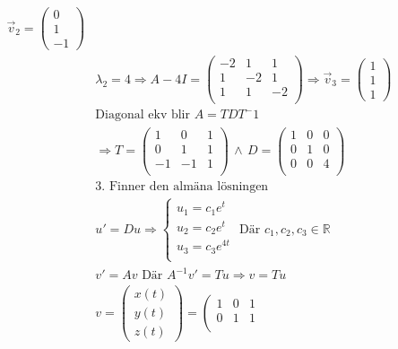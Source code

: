 \begin{multicols}{2}
\begin{align*}
  \vec{v}_2 = \begin{pmatrix} 0 \\ 1 \\ -1  \end{pmatrix} \\
  &\lambda_2 = 4 \Rightarrow{}  A -4I =
  \left(\begin{array}{ccc}
    -2 & 1 & 1 \\
    1 & -2 & 1 \\
    1 & 1 & -2 \\
  \end{array}\right) \Rightarrow{}
  \vec{v}_3 = \begin{pmatrix} 1 \\ 1 \\ 1  \end{pmatrix} \\
  &\text{Diagonal ekv blir } A=TDT^-1 \\
  &\Rightarrow{} T =
  \left(\begin{array}{ccc}
    1 &  0 & 1 \\
    0 &  1 & 1 \\
    -1 & -1 & 1 \\
  \end{array}\right) \, \land{} \, D =
  \left(\begin{array}{ccc}
    1 & 0 & 0 \\
    0 & 1 & 0 \\
    0 & 0 & 4 \\
  \end{array}\right)
  &\\
  &\text{3. Finner den almäna lösningen} \\
  &u'=Du \Rightarrow{}
  \left\{\begin{array}{rrr}
  u_1 = c_1e^{t} \\
  u_2 = c_2e^{t} \\
  u_3 = c_3e^{4t} \\
  \end{array}\right. \text{ Där } c_1,c_2,c_3\in\mathbb{R} \\
  &v'=Av \text{ Där } A^{-1}v' = Tu \Rightarrow{} v=Tu \\
  &v = \begin{pmatrix} x(t) \\ y(t) \\ z(t)  \end{pmatrix} = 
  \left(\begin{array}{ccc}
    1 &  0 & 1 \\
    0 &  1 & 1 \\

\end{array}
\end{align*}
\end{multicols}
